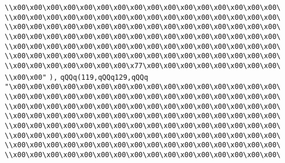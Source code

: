 \verb|\\x00\x00\x00\x00\x00\x00\x00\x00\x00\x00\x00\x00\x00\x00\x00\x00\|\newline
\verb|\\x00\x00\x00\x00\x00\x00\x00\x00\x00\x00\x00\x00\x00\x00\x00\x00\|\newline
\verb|\\x00\x00\x00\x00\x00\x00\x00\x00\x00\x00\x00\x00\x00\x00\x00\x00\|\newline
\verb|\\x00\x00\x00\x00\x00\x00\x00\x00\x00\x00\x00\x00\x00\x00\x00\x00\|\newline
\verb|\\x00\x00\x00\x00\x00\x00\x00\x00\x00\x00\x00\x00\x00\x00\x00\x00\|\newline
\verb|\\x00\x00\x00\x00\x00\x00\x00\x00\x00\x00\x00\x00\x00\x00\x00\x00\|\newline
\verb|\\x00\x00\x00\x00\x00\x00\x00\x77\x00\x00\x00\x00\x00\x00\x00\x00\|\newline
\verb|\\x00\x00"|\newline
\verb|),|\newline
\verb|qQQq(119,qQQq129,qQQq|\newline
\verb|"\x00\x00\x00\x00\x00\x00\x00\x00\x00\x00\x00\x00\x00\x00\x00\x00\|\newline
\verb|\\x00\x00\x00\x00\x00\x00\x00\x00\x00\x00\x00\x00\x00\x00\x00\x00\|\newline
\verb|\\x00\x00\x00\x00\x00\x00\x00\x00\x00\x00\x00\x00\x00\x00\x00\x00\|\newline
\verb|\\x00\x00\x00\x00\x00\x00\x00\x00\x00\x00\x00\x00\x00\x00\x00\x00\|\newline
\verb|\\x00\x00\x00\x00\x00\x00\x00\x00\x00\x00\x00\x00\x00\x00\x00\x00\|\newline
\verb|\\x00\x00\x00\x00\x00\x00\x00\x00\x00\x00\x00\x00\x00\x00\x00\x00\|\newline
\verb|\\x00\x00\x00\x00\x00\x00\x00\x00\x00\x00\x00\x00\x00\x00\x00\x00\|\newline
\verb|\\x00\x00\x00\x00\x00\x00\x00\x00\x00\x00\x00\x00\x00\x00\x00\x00\|\newline
